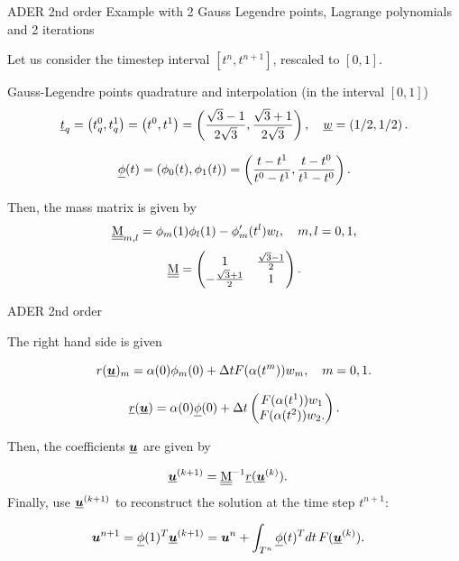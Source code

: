 \documentclass[aspectratio=169]{beamer}
\begin{document}
\begin{frame}{ADER 2nd order}
	Example with 2 Gauss Legendre points, Lagrange polynomials and 2 iterations

	Let us consider the timestep interval $[t^n,t^{n+1}]$, rescaled to $[0,1]$. 
	
	Gauss-Legendre points  quadrature and interpolation (in the interval $[0,1]$) 
	\[\underline{t}_q =  \left( t^0_q, t^1_q \right) = \left( t^0, t^1 \right) =  \left( \frac{\sqrt{3}-1}{2\sqrt{3}}, \frac{\sqrt{3}+1}{2\sqrt{3}} \right), \quad \underline{w} = \left(1/2,1/2\right). \]
	
	\[\underline{\phi}(t) = \left( \phi_0(t), \phi_1(t) \right) = \left( \frac{t-t^1}{t^0-t^1}, \frac{t-t^0}{t^1-t^0} \right). \]
	
	Then, the mass matrix is given by
	\[\underline{\underline{\mathrm{M}}}_{m,l} = \phi_m(1)\phi_l(1) - \phi'_m(t^l) w_l, \quad m, l = 0,1,\]
	\[ \underline{\underline{\mathrm{M}}} =
	\begin{pmatrix}
		1   & \frac{\sqrt{3}-1}{2}  \\
		-\frac{\sqrt{3}+1}{2}   & 1
	\end{pmatrix}.\]

\end{frame}

\begin{frame}{ADER 2nd order}

	The right hand side is given 
	
	\[ r(\underline{\boldsymbol{u}})_m = \alpha(0) \phi_m(0) + \Delta t F(\alpha(t^m)) w_m, \quad m=0,1. \] 
	
	\[ \underline{r}(\underline{\boldsymbol{u}}) = \alpha(0)\underline{\phi}(0) +\Delta t
	\begin{pmatrix}
		F(\alpha(t^1)) w_1  \\
		F(\alpha(t^2)) w_2.
	\end{pmatrix}.\]
	
	
	Then, the coefficients $\underline{\boldsymbol{u}}$ are given by
	
	\begin{align*}
		\underline{\boldsymbol{u}}^{(k+1)} &= \underline{\underline{\mathrm{M}}}^{-1} \underline{r}( \underline{\boldsymbol{u}}^{(k)} ).
	\end{align*}
	Finally, use $\underline{\boldsymbol{u}}^{(k+1)}$ to reconstruct the solution at the time step $t^{n+1}$:
	
	\begin{align*}
		\boldsymbol{u}^{n+1} &= \underline{\phi}(1)^T \underline{\boldsymbol{u}}^{(k+1)}=\boldsymbol{u}^n + \int_{T^n}\underline{\phi}(t)^T dt\, F(\underline{\boldsymbol{u}}^{(k)}).
	\end{align*}
	
	
\end{frame}
\end{document}
